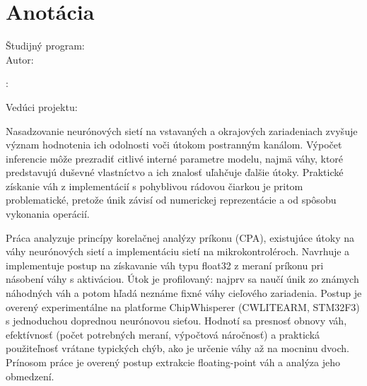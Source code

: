\thispagestyle{empty}

\vspace*{\fill}

\section*{Anotácia}

\begin{minipage}[t]{1\columnwidth}
	\FIITuniversitySK

	\FIITfacultySK

	Študijný program: \FIITstudyProgramSK\\

	Autor: \FIITauthor

	\FIITthesisSK: \FIITtitleSK

	Vedúci projektu: \FIITsupervisor

	\FIITdateSK
\end{minipage}

\bigskip{}

Nasadzovanie neurónových sietí na vstavaných a okrajových zariadeniach zvyšuje význam hodnotenia ich odolnosti voči útokom postranným kanálom. Výpočet inferencie môže prezradiť citlivé interné parametre modelu, najmä váhy, ktoré predstavujú duševné vlastníctvo a ich znalosť uľahčuje ďalšie útoky. Praktické získanie váh z implementácií s pohyblivou rádovou čiarkou je pritom problematické, pretože únik závisí od numerickej reprezentácie a od spôsobu vykonania operácií.

Práca analyzuje princípy korelačnej analýzy príkonu (CPA), existujúce útoky na váhy neurónových sietí a implementáciu sietí na mikrokontroléroch. Navrhuje a implementuje postup na získavanie váh typu float32 z meraní príkonu pri násobení váhy s aktiváciou. Útok je profilovaný: najprv sa naučí únik zo známych náhodných váh a potom hľadá neznáme fixné váhy cieľového zariadenia. Postup je overený experimentálne na platforme ChipWhisperer (CWLITEARM, STM32F3) s jednoduchou doprednou neurónovou sieťou. Hodnotí sa presnosť obnovy váh, efektívnosť (počet potrebných meraní, výpočtová náročnosť) a praktická použiteľnosť vrátane typických chýb, ako je určenie váhy až na mocninu dvoch. Prínosom práce je overený postup extrakcie floating-point váh a analýza jeho obmedzení.



